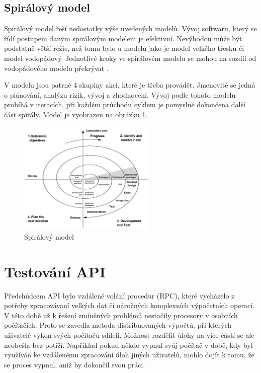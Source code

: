 \subsection{Spirálový model}
Spirálový model řeší nedostatky výše uvedených modelů. Vývoj softwaru, který se řídí postupem daným spirálovým modelem je efektivní. Nevýhodou může být podstatně větší režie, než tomu bylo u modelů jako je model velkého třesku či model vodopádový. Jednotlivé kroky ve spirálovém modelu se mohou na rozdíl od vodopádového modelu překrývat \cite{Patton2002}.

V modelu jsou patrné 4 skupiny akcí, které je třeba provádět. Jmenovitě se jedná o plánování, analýzu rizik, vývoj a zhodnocení. Vývoj podle tohoto modelu probíhá v iteracích, při každém průchodu cyklem je pomyslně dokončena další část spirály. Model je vyobrazen na obrázku \ref{fig:spiral-model}.


\begin{figure}[!h]
	\centering
	\includegraphics[width=0.58\textwidth]{Figures/Spiral_model.pdf}
	\caption{Spirálový model \cite{ee27bbyhk5LP1Ekm}}
	\label{fig:spiral-model}
\end{figure}

\newpage
\section{Testování API}
Předchůdcem API bylo vzdálené volání procedur (RPC), které vycházelo z potřeby zpracovávaní velkých dat či náročných komplexních výpočetních operací. V této době už k řešení zmíněných problémů nestačily procesory v osobních počítačích. Proto se zavedla metoda distribuovaných výpočtů, při kterých uživatelé výkon svých počítačů sdíleli. Možnost rozdělit úlohy na více částí se ale neobešla bez potíží. Například pokud někdo vypnul svůj počítač v době, kdy byl využíván ke vzdálenému zpracování úloh jiných uživatelů, mohlo dojít k tomu, že se proces vypnul, aniž by dokončil svou práci.

